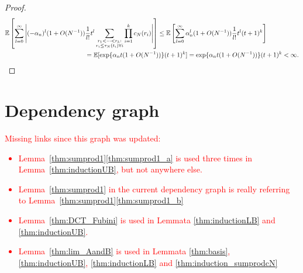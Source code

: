 \documentclass{article}
\newcommand{\seb}[1]{\xspace\textcolor{red}{#1}\xspace}
\newcommand{\E}{\mathbb{E}}
\newcommand{\1}[1]{\mathbbm{1}_{#1}}
\begin{document}
\begin{proof}
\begin{align}
\E \left[ \sum_{l=0}^\infty \Bigg| (-\alpha_n)^l (1+O(N^{-1})) \frac{1}{l!} t^l 
        \sum_{\substack{r_1 < \cdots < r_k : \\ r_i \leq \tau_N(t_i) \forall i}}
        \prod_{i=1}^k c_N(r_i) \Bigg| \right]
&\leq \E \left[ \sum_{l=0}^\infty \alpha_n^l (1+O(N^{-1})) \frac{1}{l!} t^l 
        (t+1)^k \right] \notag\\
&\hspace{-4cm}= \E[ \exp\{ \alpha_n t (1+O(N^{-1})) \} (t+1)^k ]
= \exp\{ \alpha_n t (1+O(N^{-1})) \} (t+1)^k
< \infty .
\end{align}
\end{proof}


\section*{Dependency graph}

\seb{
Missing links since this graph was updated:
\begin{itemize}
\item Lemma~\ref{thm:sumprod1}\ref{thm:sumprod1_a} is used three times in Lemma~\ref{thm:inductionUB}, but not anywhere else.
\item Lemma~\ref{thm:sumprod1} in the current dependency graph is really referring to Lemma~\ref{thm:sumprod1}\ref{thm:sumprod1_b}
\item Lemma~\ref{thm:DCT_Fubini} %
is used in Lemmata \ref{thm:inductionLB} and \ref{thm:inductionUB}.
\item Lemma~\ref{thm:lim_AandB} is used in Lemmata \ref{thm:basis}, \ref{thm:inductionUB}, \ref{thm:inductionLB} and \ref{thm:induction_sumprodcN}
\end{itemize}
}
\end{document}
